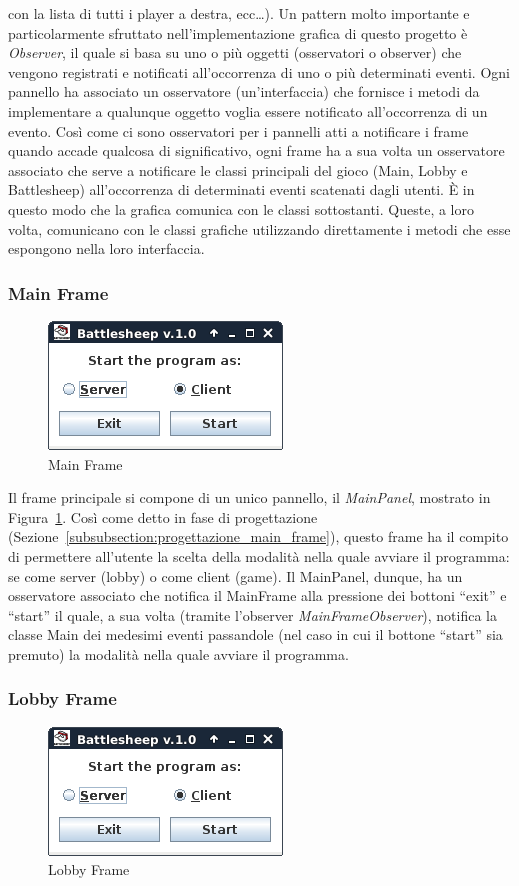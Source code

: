 con la lista di tutti i player a destra, ecc\dots).\newline
Un pattern molto importante e particolarmente sfruttato nell'implementazione
grafica di questo progetto è \textit{Observer}, il quale si basa su uno o più
oggetti (osservatori o observer) che vengono registrati e notificati
all'occorrenza di uno o più determinati eventi. Ogni pannello ha associato un
osservatore (un'interfaccia) che fornisce i metodi da implementare a qualunque
oggetto voglia essere notificato all'occorrenza di un evento. Così come ci sono
osservatori per i pannelli atti a notificare i frame quando accade qualcosa di
significativo, ogni frame ha a sua volta un osservatore associato che serve a
notificare le classi principali del gioco (Main, Lobby e Battlesheep)
all'occorrenza di determinati eventi scatenati dagli utenti. È in questo modo
che la grafica comunica con le classi sottostanti. Queste, a loro volta,
comunicano con le classi grafiche utilizzando direttamente i metodi che esse
espongono nella loro interfaccia.



\subsubsection{Main Frame}
\begin{figure}[!h]
	\centering
	\includegraphics[scale=0.5]{core/imgs/gui/main_frame}
	\caption{Main Frame}
	\label{figure:main_frame}
\end{figure}
Il frame principale si compone di un unico pannello, il \textit{MainPanel},
mostrato in Figura~\ref{figure:main_frame}. Così come detto in fase di
progettazione (Sezione~\ref{subsubsection:progettazione_main_frame}), questo
frame ha il compito di permettere all'utente la scelta della modalità nella
quale avviare il programma: se come server (lobby) o come client (game).\newline
Il MainPanel, dunque, ha un osservatore associato che notifica il MainFrame alla
pressione dei bottoni ``exit'' e ``start'' il quale, a sua volta (tramite
l'observer \textit{MainFrameObserver}), notifica la classe Main dei medesimi
eventi passandole (nel caso in cui il bottone ``start'' sia premuto) la modalità
nella quale avviare il programma.



\subsubsection{Lobby Frame}
\begin{figure}
	\centering
	\includegraphics[scale=0.5]{core/imgs/gui/main_frame}
	\caption{Lobby Frame}
	\label{figure:lobby_frame}
\end{figure}


